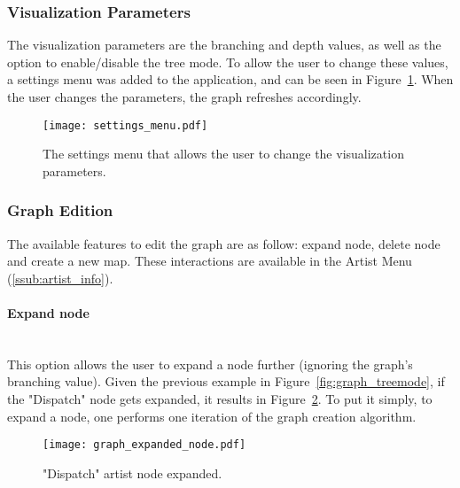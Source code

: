 
    \subsubsection{Visualization Parameters} %
    \label{ssub:visualization_parameters}
    
    The visualization parameters are the branching and depth values, as well as the option to enable/disable the tree mode.
    To allow the user to change these values, a settings menu was added to the application, and can be seen in Figure~\ref{fig:settings_menu}.
    When the user changes the parameters, the graph refreshes accordingly.

    \begin{figure}[H]
      \begin{center}
        \texttt{[image: settings\_menu.pdf]}
      \end{center}
      \caption{The settings menu that allows the user to change the visualization parameters.}
      \label{fig:settings_menu} 
    \end{figure}


    \subsubsection{Graph Edition} %
      \label{ssub:edition}

      The available features to edit the graph are as follow: expand node, delete node and create a new map.
      These interactions are available in the Artist Menu (\ref{ssub:artist_info}).

      \paragraph{Expand node} \hfill \\
      This option allows the user to expand a node further (ignoring the graph's branching value).
      Given the previous example in Figure~\ref{fig:graph_treemode}, if the "Dispatch" node gets expanded, it results in Figure~\ref{fig:node_expanded}.
      To put it simply, to expand a node, one performs one iteration of the graph creation algorithm.

      \begin{figure}[tb]
         \begin{center}
           \texttt{[image: graph\_expanded\_node.pdf]}
         \end{center}
         \caption{"Dispatch" artist node expanded.}
         \label{fig:node_expanded}
      \end{figure}

